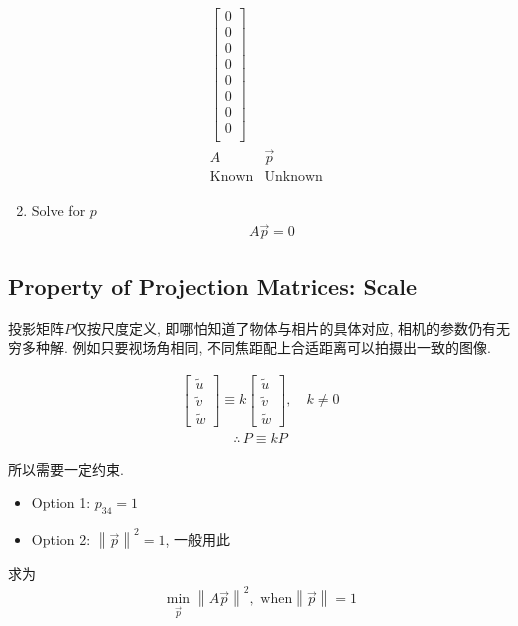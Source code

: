 \begin{enumerate}
\begin{align*}
\begin{array}{cccc}
\begin{bmatrix}
                0\\0\\0\\0\\
                0\\0\\0\\0\\
            \end{bmatrix}\\
            A&\vec{p}&\\
            \text{Known} &\text{Unknown}&
        \end{array}
    \end{align*}
    \addtocounter{MaxMatrixCols}{10}
    \item Solve for $p$
    \begin{align*}
        A\vec{p}=0
    \end{align*}
\end{enumerate}

\subsection{Property of Projection Matrices: Scale}
投影矩阵$P$仅按尺度定义, 即哪怕知道了物体与相片的具体对应, 相机的参数仍有无穷多种解. 例如只要视场角相同, 不同焦距配上合适距离可以拍摄出一致的图像. 

\begin{align*}
    \begin{bmatrix}
        \tilde{u}\\\tilde{v}\\\tilde{w}
    \end{bmatrix}\equiv k\begin{bmatrix}
        \tilde{u}\\\tilde{v}\\\tilde{w}
    \end{bmatrix},\quad k\ne 0
\end{align*}
\begin{align*}
    \therefore \,  P\equiv kP
\end{align*}

所以需要一定约束. 
\begin{itemize}
    \item Option 1: $p_{34}=1$
    \item Option 2: $\left\| \vec{p} \right\|^2=1$, 一般用此
\end{itemize}

求为
\begin{align*}
    \min_{\vec{p}} \left\| A\vec{p} \right\|^2 ,\text{ when} \left\| \vec{p} \right\|=1
\end{align*}

